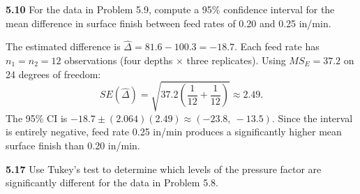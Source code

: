 \documentclass[answers,12pt,addpoints]{exam}
\begin{document}
\textbf{5.10} For the data in Problem 5.9, compute a 95\% confidence interval for the mean difference in surface finish between feed rates of 0.20 and 0.25 in/min.

\begin{solution}
The estimated difference is $\hat{\Delta} = 81.6 - 100.3 = -18.7$. Each feed rate has $n_1 = n_2 = 12$ observations (four depths $\times$ three replicates). Using $MS_E = 37.2$ on 24 degrees of freedom:
\[
  SE(\hat{\Delta}) = \sqrt{37.2\left(\frac{1}{12}+\frac{1}{12}\right)} \approx 2.49.
\]
The 95\% CI is $-18.7 \pm (2.064)(2.49) \approx (-23.8,\ -13.5)$. Since the interval is entirely negative, feed rate 0.25 in/min produces a significantly higher mean surface finish than 0.20 in/min.
\end{solution}

\textbf{5.17} Use Tukey's test to determine which levels of the pressure factor are significantly different for the data in Problem 5.8.
\end{document}
